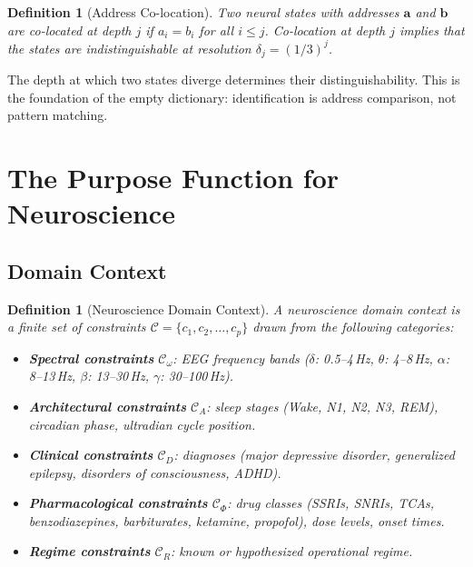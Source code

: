 \documentclass[aps,prd,twocolumn,superscriptaddress,floatfix,nofootinbib]{revtex4-2}
\newtheorem{definition}[theorem]{Definition}
\theoremstyle{remark}
\newcommand{\Context}{\mathcal{C}}
\begin{document}
\begin{definition}[Address Co-location]
\label{def:colocation}
Two neural states with addresses $\mathbf{a}$ and $\mathbf{b}$ are \emph{co-located at depth $j$} if $a_i = b_i$ for all $i \leq j$.
Co-location at depth $j$ implies that the states are indistinguishable at resolution $\delta_j = (1/3)^j$.
\end{definition}

The depth at which two states diverge determines their distinguishability.
This is the foundation of the empty dictionary: identification is address comparison, not pattern matching.


\section{The Purpose Function for Neuroscience}
\label{sec:purpose}

\subsection{Domain Context}

\begin{definition}[Neuroscience Domain Context]
\label{def:context}
A neuroscience domain context is a finite set of constraints $\Context = \{c_1, c_2, \ldots, c_p\}$ drawn from the following categories:
\begin{itemize}[noitemsep]
    \item \textbf{Spectral constraints} $\Context_\omega$: EEG frequency bands ($\delta$: 0.5--4\,Hz, $\theta$: 4--8\,Hz, $\alpha$: 8--13\,Hz, $\beta$: 13--30\,Hz, $\gamma$: 30--100\,Hz).
    \item \textbf{Architectural constraints} $\Context_A$: sleep stages (Wake, N1, N2, N3, REM), circadian phase, ultradian cycle position.
    \item \textbf{Clinical constraints} $\Context_D$: diagnoses (major depressive disorder, generalized epilepsy, disorders of consciousness, ADHD).
    \item \textbf{Pharmacological constraints} $\Context_\Phi$: drug classes (SSRIs, SNRIs, TCAs, benzodiazepines, barbiturates, ketamine, propofol), dose levels, onset times.
    \item \textbf{Regime constraints} $\Context_R$: known or hypothesized operational regime.
\end{itemize}
\end{definition}
\end{document}
